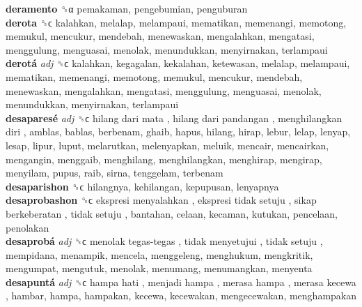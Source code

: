 \textbf{deramento} ␝α  pemakaman, pengebumian, penguburan  \\
\textbf{derota} ␝ϲ  kalahkan, melalap, melampaui, mematikan, memenangi, memotong, memukul, mencukur, mendebah, menewaskan, mengalahkan, mengatasi, menggulung, menguasai, menolak, menundukkan, menyirnakan, terlampaui  \\
\textbf{derotá} \emph{adj}  ␝ϲ  kalahkan, kegagalan, kekalahan, ketewasan, melalap, melampaui, mematikan, memenangi, memotong, memukul, mencukur, mendebah, menewaskan, mengalahkan, mengatasi, menggulung, menguasai, menolak, menundukkan, menyirnakan, terlampaui  \\
\textbf{desaparesé} \emph{adj}  ␝ϲ   hilang dari mata ,  hilang dari pandangan ,  menghilangkan diri , amblas, bablas, berbenam, ghaib, hapus, hilang, hirap, lebur, lelap, lenyap, lesap, lipur, luput, melarutkan, melenyapkan, meluik, mencair, mencairkan, mengangin, menggaib, menghilang, menghilangkan, menghirap, mengirap, menyilam, pupus, raib, sirna, tenggelam, terbenam  \\
\textbf{desaparishon} ␝ϲ  hilangnya, kehilangan, kepupusan, lenyapnya  \\
\textbf{desaprobashon} ␝ϲ   ekspresi menyalahkan ,  ekspresi tidak setuju ,  sikap berkeberatan ,  tidak setuju , bantahan, celaan, kecaman, kutukan, pencelaan, penolakan  \\
\textbf{desaprobá} \emph{adj}  ␝ϲ   menolak tegas-tegas ,  tidak menyetujui ,  tidak setuju , mempidana, menampik, mencela, menggeleng, menghukum, mengkritik, mengumpat, mengutuk, menolak, menumang, menumangkan, menyenta  \\
\textbf{desapuntá} \emph{adj}  ␝ϲ   hampa hati ,  menjadi hampa ,  merasa hampa ,  merasa kecewa , hambar, hampa, hampakan, kecewa, kecewakan, mengecewakan, menghampakan  \\

